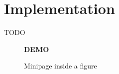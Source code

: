 \chapter{Implementation}
TODO

\begin{figure}
  \begin{minipage}{.9\linewidth}
    \textbf{DEMO}
  \lipsum[5]
  \end{minipage}
  \caption{\label{fig:minipagedemo} Minipage inside a figure}
\end{figure}
